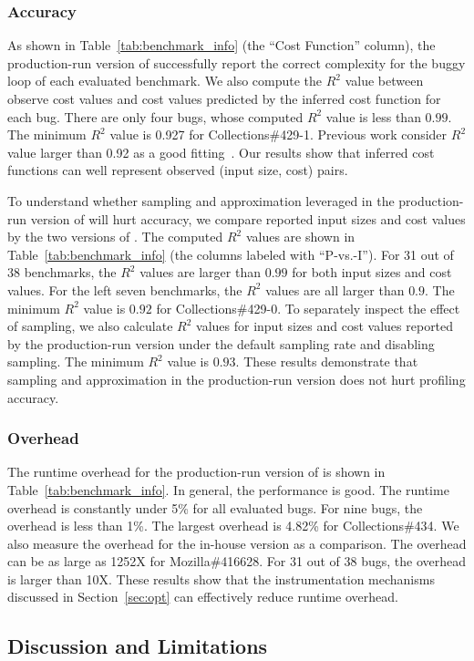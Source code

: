 \subsubsection{Accuracy}
As shown in Table~\ref{tab:benchmark_info} (the ``Cost Function'' column),
the production-run version of \Tool successfully 
report the correct complexity for the buggy loop of 
each evaluated benchmark. 
We also compute the $R^2$ value between observe cost values and 
cost values predicted by the inferred cost function for each bug.  
There are only four bugs, whose computed $R^2$ value is less than $0.99$.
The minimum $R^2$ value is 0.927 for Collections\#429-1. 
Previous work consider $R^2$ value larger than 0.92 
as a good fitting~\cite{rsquare-value}.
Our results show that inferred cost functions can well represent 
observed (input size, cost) pairs. 

To understand whether sampling and approximation leveraged 
in the production-run version of \Tool will hurt accuracy, 
we compare reported input sizes and cost values by the two versions of \Tool.
The computed $R^2$ values are shown in Table~\ref{tab:benchmark_info} 
(the columns labeled with ``P-vs.-I''). 
For 31 out of 38 benchmarks, 
the $R^2$ values are larger than $0.99$ for both input sizes and cost values. 
For the left seven benchmarks, the $R^2$ values are all larger than $0.9$.
The minimum $R^2$ value is $0.92$ for Collections\#429-0. 
To separately inspect the effect of sampling, 
we also calculate $R^2$ values for input sizes and cost values reported 
by the production-run version under the default sampling rate and disabling sampling. 
The minimum $R^2$ value is $0.93$. 
These results demonstrate that sampling and approximation in the production-run 
version does not hurt profiling accuracy. 


\subsubsection{Overhead}
The runtime overhead for the production-run version of \Tool is 
shown in Table~\ref{tab:benchmark_info}. 
In general, the performance is good. The runtime overhead is constantly 
under 5\% for all evaluated bugs. 
For nine bugs, the overhead is less than 1\%. 
The largest overhead is 4.82\% for Collections\#434. 
We also measure the overhead for the in-house version as a comparison. 
The overhead can be as large as 1252X for Mozilla\#416628.
For 31 out of 38 bugs, the overhead is larger than 10X. 
These results show that the instrumentation mechanisms 
discussed in Section~\ref{sec:opt} can effectively reduce runtime overhead. 



\subsection{Discussion and Limitations}


